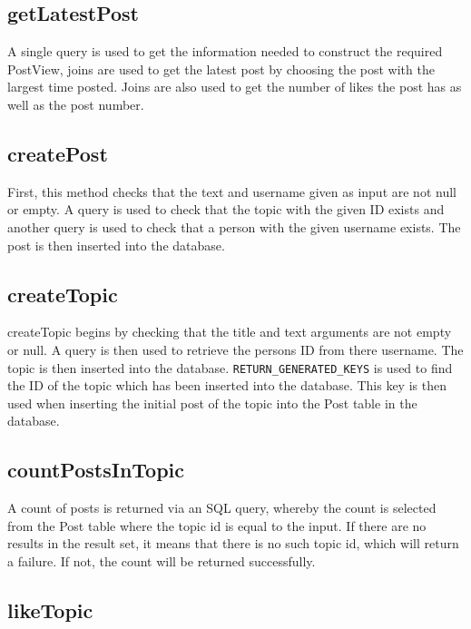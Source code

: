 \documentclass{article}
\begin{document}
\subsection*{getLatestPost}

A single query is used to get the information needed to construct the required PostView, joins are used to get the latest post by choosing the post with the largest time posted. Joins are also used to get the number of likes the post has as well as the post number.

\subsection*{createPost}

First, this method checks that the text and username given as input are not null or empty. A query is used to check that the topic with the given ID exists and another query is used to check that a person with the given username exists. The post is then inserted into the database.

\subsection*{createTopic}

createTopic begins by checking that the title and text arguments are not empty or null. A query is then used to retrieve the persons ID from there username. The topic is then inserted into the database. \texttt{RETURN\_GENERATED\_KEYS} is used to find the ID of the topic which has been inserted into the database. This key is then used when inserting the initial post of the topic into the Post table in the database.

\subsection*{countPostsInTopic}

A count of posts is returned via an SQL query, whereby the count is selected from the Post table where the topic id is equal to the input. If there are no results in the result set, it means that there is no such topic id, which will return a failure. If not, the count will be returned successfully.

\subsection*{likeTopic}
\end{document}
